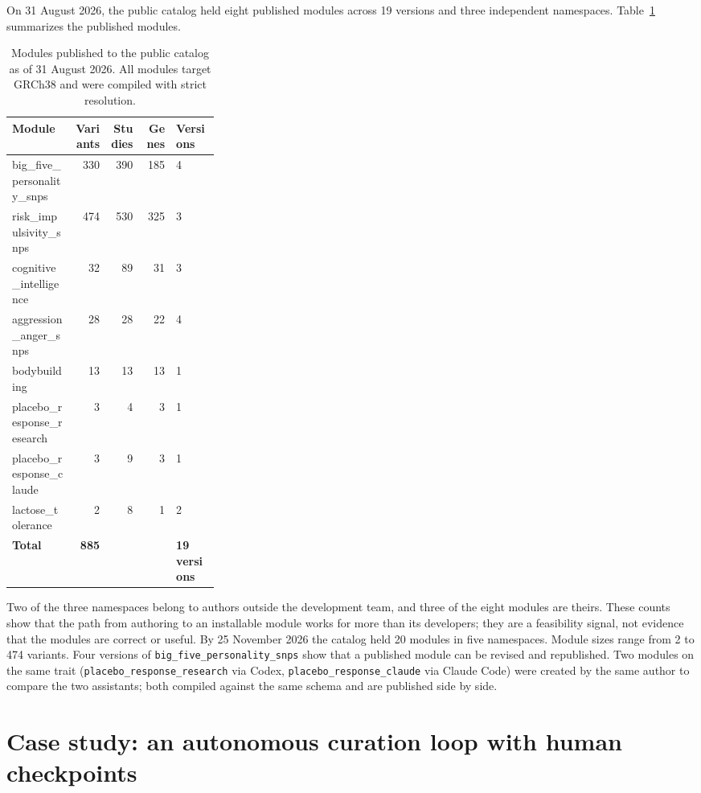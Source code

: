 \documentclass[11pt,a4paper]{article}
\begin{document}
On 31 August 2026, the public catalog held eight published modules
across 19 versions and three independent namespaces. Table~\ref{tab:catalog} summarizes the published modules.

\begin{table}[ht]
\centering
\small
\caption{Modules published to the public catalog as of 31 August 2026.
All modules target GRCh38 and were compiled with strict resolution.}
\label{tab:catalog}
\begin{tabular}{@{}p{0.30\linewidth}rrrl@{}}
\toprule
Module & Variants & Studies & Genes & Versions \\
\midrule
big\_five\_personality\_snps & 330 & 390 & 185 & 4 \\
risk\_impulsivity\_snps  & 474 & 530 & 325 & 3 \\
cognitive\_intelligence & 32  &  89 &  31 & 3 \\
aggression\_anger\_snps  & 28  &  28 &  22 & 4 \\
bodybuilding            & 13  &  13 &  13 & 1 \\
placebo\_response\_research &  3  &   4 &   3 & 1 \\
placebo\_response\_claude & 3 &   9 &   3 & 1 \\
lactose\_tolerance      &  2  &   8 &   1 & 2 \\
\midrule
\textbf{Total}         & \textbf{885} & & & \textbf{19 versions} \\
\bottomrule
\end{tabular}
\end{table}

Two of the three namespaces belong to authors outside the development team,
and three of the eight modules are theirs. These counts show that the path
from authoring to an installable module works for more than its developers;
they are a feasibility signal, not evidence that the modules are correct or
useful. By 25 November 2026 the catalog held 20 modules in five namespaces. Module sizes range from 2 to 474
variants. Four versions of \texttt{big\_five\_personality\_snps} show that a
published module can be revised and republished. Two modules on the same trait
(\texttt{placebo\_response\_research} via Codex, \texttt{placebo\_response\_claude} via
Claude Code) were created by the same author to compare the two assistants;
both compiled against the same schema and are published side by side.

\section{Case study: an autonomous curation loop with human checkpoints}
\label{sec:loop}
\end{document}
